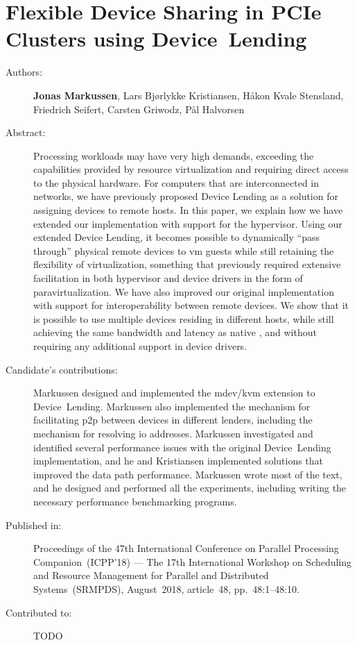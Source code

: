\chapter{Flexible Device Sharing in PCIe Clusters using Device~Lending}
\label{paper:SRMPDS}
\paperthumb

\begin{description}
	\item[Authors:]
		\textbf{Jonas Markussen}, Lars Bj{\o}rlykke Kristiansen, H{\aa}kon Kvale Stensland,
		Friedrich Seifert, Carsten Griwodz, P{\aa}l Halvorsen

	\item[Abstract:]
		Processing workloads may have very high  demands, exceeding the capabilities provided by resource
		virtualization and requiring direct access to the physical hardware.
		For computers that are interconnected in  networks, we have previously proposed 
		Device Lending as a solution for assigning devices to remote hosts. In this paper, we
		explain how we have extended our implementation with support for the  \gls{hypervisor}.
		Using our extended Device Lending, it becomes possible to dynamically ``pass through'' physical remote devices
		to \acrshort{vm} guests while still retaining the flexibility of virtualization, something that previously required
		extensive facilitation in both \gls{hypervisor} and device drivers in the form of \gls{paravirtualization}.
		We have also improved our original implementation with support for interoperability between remote devices.
		We show that it is possible to use multiple devices residing in different hosts, while still achieving the same
		bandwidth and latency as native , and without requiring any additional support in device drivers. 


	\item[Candidate's contributions:]
		Markussen designed and implemented the \acrshort{mdev}/\acrshort{kvm} extension to Device~Lending.
		Markussen also implemented the mechanism for facilitating \acrshort{p2p} between devices in different lenders,
		including the mechanism for resolving \gls{io} addresses.
		Markussen investigated and identified several performance issues with the original Device~Lending implementation, 
		and he and Kristiansen implemented solutions that improved the data path performance. 
		Markussen wrote most of the text, and he designed and performed all the experiments, including writing the necessary performance benchmarking programs.

	\item[Published in:]
		Proceedings of the 47th International Conference on Parallel Processing Companion~(ICPP'18) ---
		The 17th International Workshop on Scheduling and Resource Management for Parallel and Distributed Systems~(SRMPDS),
		August~2018, article~48, pp.~48:1--48:10.

	\item[Contributed to:]
		TODO

\end{description}
